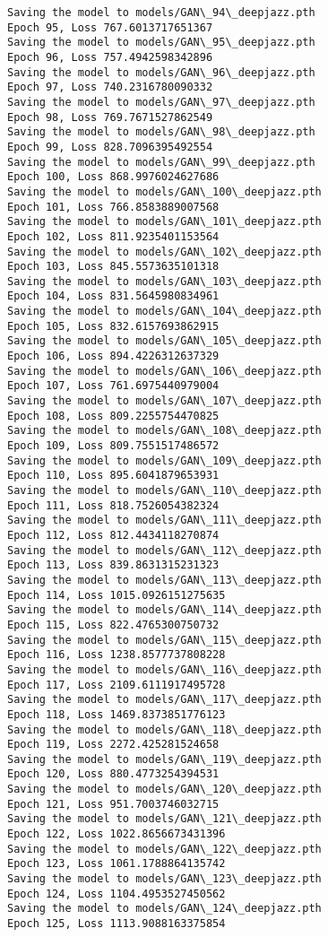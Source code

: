 \documentclass[11pt]{article}
\begin{document}
\begin{Verbatim}[commandchars=\\\{\}]
Saving the model to models/GAN\_94\_deepjazz.pth
Epoch 95, Loss 767.6013717651367
Saving the model to models/GAN\_95\_deepjazz.pth
Epoch 96, Loss 757.4942598342896
Saving the model to models/GAN\_96\_deepjazz.pth
Epoch 97, Loss 740.2316780090332
Saving the model to models/GAN\_97\_deepjazz.pth
Epoch 98, Loss 769.7671527862549
Saving the model to models/GAN\_98\_deepjazz.pth
Epoch 99, Loss 828.7096395492554
Saving the model to models/GAN\_99\_deepjazz.pth
Epoch 100, Loss 868.9976024627686
Saving the model to models/GAN\_100\_deepjazz.pth
Epoch 101, Loss 766.8583889007568
Saving the model to models/GAN\_101\_deepjazz.pth
Epoch 102, Loss 811.9235401153564
Saving the model to models/GAN\_102\_deepjazz.pth
Epoch 103, Loss 845.5573635101318
Saving the model to models/GAN\_103\_deepjazz.pth
Epoch 104, Loss 831.5645980834961
Saving the model to models/GAN\_104\_deepjazz.pth
Epoch 105, Loss 832.6157693862915
Saving the model to models/GAN\_105\_deepjazz.pth
Epoch 106, Loss 894.4226312637329
Saving the model to models/GAN\_106\_deepjazz.pth
Epoch 107, Loss 761.6975440979004
Saving the model to models/GAN\_107\_deepjazz.pth
Epoch 108, Loss 809.2255754470825
Saving the model to models/GAN\_108\_deepjazz.pth
Epoch 109, Loss 809.7551517486572
Saving the model to models/GAN\_109\_deepjazz.pth
Epoch 110, Loss 895.6041879653931
Saving the model to models/GAN\_110\_deepjazz.pth
Epoch 111, Loss 818.7526054382324
Saving the model to models/GAN\_111\_deepjazz.pth
Epoch 112, Loss 812.4434118270874
Saving the model to models/GAN\_112\_deepjazz.pth
Epoch 113, Loss 839.8631315231323
Saving the model to models/GAN\_113\_deepjazz.pth
Epoch 114, Loss 1015.0926151275635
Saving the model to models/GAN\_114\_deepjazz.pth
Epoch 115, Loss 822.4765300750732
Saving the model to models/GAN\_115\_deepjazz.pth
Epoch 116, Loss 1238.8577737808228
Saving the model to models/GAN\_116\_deepjazz.pth
Epoch 117, Loss 2109.6111917495728
Saving the model to models/GAN\_117\_deepjazz.pth
Epoch 118, Loss 1469.8373851776123
Saving the model to models/GAN\_118\_deepjazz.pth
Epoch 119, Loss 2272.425281524658
Saving the model to models/GAN\_119\_deepjazz.pth
Epoch 120, Loss 880.4773254394531
Saving the model to models/GAN\_120\_deepjazz.pth
Epoch 121, Loss 951.7003746032715
Saving the model to models/GAN\_121\_deepjazz.pth
Epoch 122, Loss 1022.8656673431396
Saving the model to models/GAN\_122\_deepjazz.pth
Epoch 123, Loss 1061.1788864135742
Saving the model to models/GAN\_123\_deepjazz.pth
Epoch 124, Loss 1104.4953527450562
Saving the model to models/GAN\_124\_deepjazz.pth
Epoch 125, Loss 1113.9088163375854

\end{Verbatim}
\end{document}
